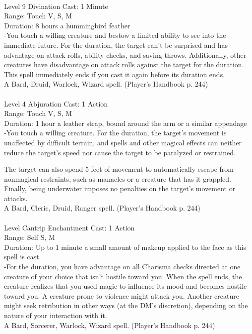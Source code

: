 \documentclass[10pt,twocolumn]{report}
\begin{document}
 \\
Level 9 \quad Divination \quad Cast: 1 Minute\\
Range: Touch \quad V, S, M\\
Duration: 8 hours \quad a hummingbird feather\\
-You touch a willing creature and bestow a limited ability to see into the immediate future. For the duration, the target can’t be surprised and has advantage on attack rolls, ability checks, and saving throws. Additionally, other creatures have disadvantage on attack rolls against the target for the duration.
This spell immediately ends if you cast it again before its duration ends.\\
A Bard, Druid, Warlock, Wizard spell. (Player's Handbook p. 244) \\


 \\
Level 4 \quad Abjuration \quad Cast: 1 Action\\
Range: Touch \quad V, S, M\\
Duration: 1 hour \quad a leather strap, bound around the arm or a similar appendage\\
-You touch a willing creature. For the duration, the target’s movement is unaffected by difficult terrain, and spells and other magical effects can neither reduce the target’s speed nor cause the target to be paralyzed or restrained.

The target can also spend 5 feet of movement to automatically escape from nonmagical restraints, such as manacles or a creature that has it grappled. Finally, being underwater imposes no penalties on the target’s movement or attacks.\\
A Bard, Cleric, Druid, Ranger spell. (Player's Handbook p. 244) \\


 \\
Level Cantrip \quad Enchantment \quad Cast: 1 Action\\
Range: Self \quad S, M\\
Duration: Up to 1 minute \quad a small amount of makeup applied to the face as this spell is cast\\
-For the duration, you have advantage on all Charisma checks directed at one creature of your choice that isn’t hostile toward you. When the spell ends, the creature realizes that you used magic to influence its mood and becomes hostile toward you. A creature prone to violence might attack you. Another creature might seek retribution in other ways (at the DM’s discretion), depending on the nature of your interaction with it.\\
A Bard, Sorcerer, Warlock, Wizard spell. (Player's Handbook p. 244) \\
\end{document}

